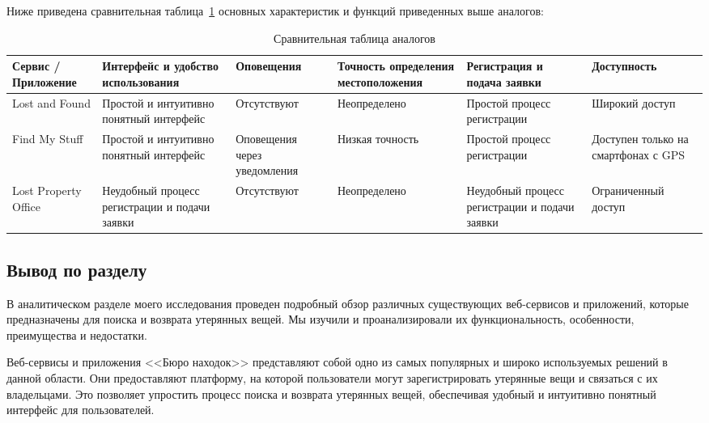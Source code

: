 \documentclass{mirea}
\begin{document}
Ниже приведена сравнительная таблица~\ref{tab:analogs_comparison} основных характеристик и функций приведенных выше аналогов:
\begin{table}[htb]
	\caption{Сравнительная таблица аналогов}
	\centering
	
	\emergencystretch=10pt
	\begin{tabular}{ |p{2cm}|p{3cm}|p{2cm}|p{2cm}|p{3cm}|p{2cm}| } 
		\hline
		Сервис / Приложение & Интерфейс и удобство использования & Опове\-ще\-ния & Точность определения местоположения & Регистрация и подача заявки & Доступ\-ность \\ \hline
		
		Lost and Found & Простой и интуитивно понятный интерфейс & Отсут\-ству\-ют & Не\-оп\-ре\-де\-ле\-но & Простой процесс регистрации & Широкий доступ \\ \hline
		
		Find My Stuff & Простой и интуитивно понятный интерфейс & Опо\-ве\-ще\-ния через уведомления & Низкая точность & Простой процесс регистрации & Доступен только на смартфонах с GPS \\ \hline
		
		Lost Property Office & Неудобный процесс регистрации и подачи заявки & Отсут\-ству\-ют & Не\-оп\-ре\-де\-ле\-но & Неудобный процесс регистрации и подачи заявки & Огра\-ни\-чен\-ный доступ \\ \hline
	\end{tabular}
	\label{tab:analogs_comparison}
\end{table}

\subsection*{Вывод по разделу}

В аналитическом разделе моего исследования проведен подробный обзор различных существующих веб-сервисов и приложений, которые предназначены для поиска и возврата утерянных вещей. Мы изучили и проанализировали их функциональность, особенности, преимущества и недостатки.

Веб-сервисы и приложения <<Бюро находок>> представляют собой одно из самых популярных и широко используемых решений в данной области. Они предоставляют платформу, на которой пользователи могут зарегистрировать утерянные вещи и связаться с их владельцами. Это позволяет упростить процесс поиска и возврата утерянных вещей, обеспечивая удобный и интуитивно понятный интерфейс для пользователей.
\end{document}
